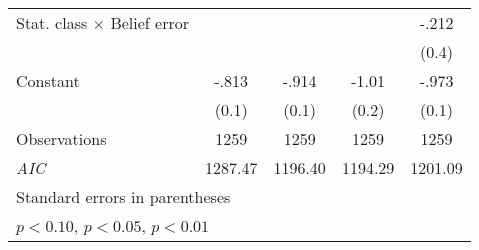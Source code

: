 \begin{table}[htbp]
\begin{tabular}{l*{4}{c}}
Stat. class $\times$ Belief error&                  &                  &                  &    -.212         \\
                &                  &                  &                  &    (0.4)         \\
Constant        &    -.813\sym{***}&    -.914\sym{***}&    -1.01\sym{***}&    -.973\sym{***}\\
                &    (0.1)         &    (0.1)         &    (0.2)         &    (0.1)         \\
\hline
Observations    &     1259         &     1259         &     1259         &     1259         \\
\textit{AIC}    &  1287.47         &  1196.40         &  1194.29         &  1201.09         \\
\hline\hline
\multicolumn{5}{l}{\footnotesize Standard errors in parentheses}\\
\multicolumn{5}{l}{\footnotesize \sym{*} \(p<0.10\), \sym{**} \(p<0.05\), \sym{***} \(p<0.01\)}\\
\end{tabular}
\end{table}
